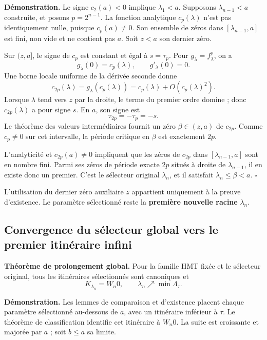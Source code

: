 \textbf{Démonstration.} Le signe \(c_2(a)<0\) implique \(\lambda_1<a\). Supposons \(\lambda_{n-1}<a\) construite, et posons \(p=2^{n-1}\). La fonction analytique \(c_p(\lambda)\) n’est pas identiquement nulle, puisque \(c_p(a)\ne0\). Son ensemble de zéros dans \([\lambda_{n-1},a]\) est fini, non vide et ne contient pas \(a\). Soit \(z<a\) son dernier zéro.

Sur \((z,a]\), le signe de \(c_p\) est constant et égal à \(s=\tau_p\). Pour \(g_\lambda=f_\lambda^p\), on a
\[
g_\lambda(0)=c_p(\lambda),\qquad g'_\lambda(0)=0.
\]
Une borne locale uniforme de la dérivée seconde donne
\begin{equation}
c_{2p}(\lambda)
=g_\lambda(c_p(\lambda))
=c_p(\lambda)+O(c_p(\lambda)^2).
\label{hmtfg:clasificacion:eq:9}
\end{equation}
Lorsque \(\lambda\) tend vers \(z\) par la droite, le terme du premier ordre domine ; donc \(c_{2p}(\lambda)\) a pour signe \(s\). En \(a\), son signe est
\[
\tau_{2p}=-\tau_p=-s.
\]
Le théorème des valeurs intermédiaires fournit un zéro \(\beta\in(z,a)\) de \(c_{2p}\). Comme \(c_p\ne0\) sur cet intervalle, la période critique en \(\beta\) est exactement \(2p\).

L’analyticité et \(c_{2p}(a)\ne0\) impliquent que les zéros de \(c_{2p}\) dans \([\lambda_{n-1},a]\) sont en nombre fini. Parmi ses zéros de période exacte \(2p\) situés à droite de \(\lambda_{n-1}\), il en existe donc un premier. C’est le sélecteur original \(\lambda_n\), et il satisfait \(\lambda_n\le\beta<a\). \(\square\)

L’utilisation du dernier zéro auxiliaire \(z\) appartient uniquement à la preuve d’existence. Le paramètre sélectionné reste la \textbf{première nouvelle racine} \(\lambda_n\).


\subsection{Convergence du sélecteur global vers le premier itinéraire infini}
\label{hmtfg:clasificacion:5}

\textbf{Théorème de prolongement global.} Pour la famille HMT fixée et le sélecteur original, tous les itinéraires sélectionnés sont canoniques et
\begin{equation}
\boxed{K_{\lambda_n}=W_n0,\qquad
\lambda_n\nearrow\min\Lambda_\tau.}
\label{hmtfg:clasificacion:eq:10}
\end{equation}

\textbf{Démonstration.} Les lemmes de comparaison et d’existence placent chaque paramètre sélectionné au-dessous de \(a\), avec un itinéraire inférieur à \(\tau\). Le théorème de classification identifie cet itinéraire à \(W_n0\). La suite est croissante et majorée par \(a\) ; soit \(b\le a\) sa limite.

